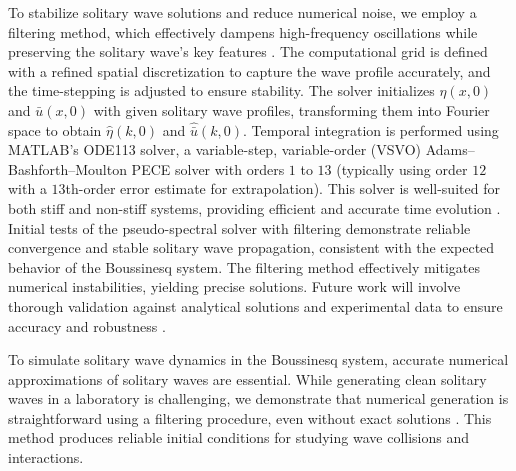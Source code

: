 \documentclass[alpha-refs, 12pt]{wiley-article}
\begin{document}
To stabilize solitary wave solutions and reduce numerical noise, we employ a filtering method, which effectively dampens high-frequency oscillations while preserving the solitary wave's key features \citep{BonaCh, Trefethen2000}. The computational grid is defined with a refined spatial discretization to capture the wave profile accurately, and the time-stepping is adjusted to ensure stability. The solver initializes $\eta(x,0)$ and $\bar{u}(x,0)$ with given solitary wave profiles, transforming them into Fourier space to obtain $\hat{\eta}(k,0)$ and $\hat{\bar{u}}(k,0)$. Temporal integration is performed using MATLAB's ODE113 solver, a variable-step, variable-order (VSVO) Adams--Bashforth--Moulton PECE solver with orders $1$ to $13$ (typically using order $12$ with a $13$th-order error estimate for extrapolation). This solver is well-suited for both stiff and non-stiff systems, providing efficient and accurate time evolution \citep{Boyd2000}. Initial tests of the pseudo-spectral solver with filtering demonstrate reliable convergence and stable solitary wave propagation, consistent with the expected behavior of the Boussinesq system. The filtering method effectively mitigates numerical instabilities, yielding precise solutions. Future work will involve thorough validation against analytical solutions and experimental data to ensure accuracy and robustness \citep{BonaCh,Trefethen2000}.

To simulate solitary wave dynamics in the Boussinesq system, accurate numerical approximations of solitary waves are essential. While generating clean solitary waves in a laboratory is challenging, we demonstrate that numerical generation is straightforward using a filtering procedure, even without exact solutions \cite{BDM2}. This method produces reliable initial conditions for studying wave collisions and interactions.
\end{document}
